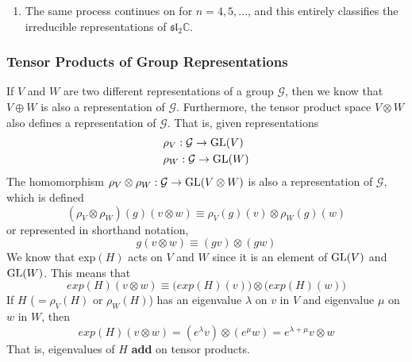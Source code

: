 \begin{enumerate}
    \item The same process continues on for $n=4, 5, ...$, and this entirely classifies the irreducible representations of $\mathfrak{sl}_2 \mathbb{C}$. 
  \end{enumerate} 

  \pagebreak

  \subsubsection{Tensor Products of Group Representations}

    \begin{definition}
      If $V$ and $W$ are two different representations of a group $\mathcal{G}$, then we know that $V \oplus W$ is also a representation of $\mathcal{G}$. Furthermore, the tensor product space $V \otimes W$ also defines a representation of $\mathcal{G}$. That is, given representations
      \begin{align*}
        & \rho_V: \mathcal{G} \rightarrow \operatorname{GL}(V) \\
        & \rho_W: \mathcal{G} \rightarrow \operatorname{GL}(W)
      \end{align*}
      The homomorphism $\rho_V \otimes \rho_W: \mathcal{G} \rightarrow \operatorname{GL}(V \otimes W)$ is also a representation of $\mathcal{G}$, which is defined
      \begin{equation}
        (\rho_V \otimes \rho_W)(g) (v \otimes w) \equiv \rho_V (g) (v) \otimes \rho_W (g) (w)
      \end{equation}
      or represented in shorthand notation, 
      \begin{equation}
        g(v \otimes w) \equiv (g v) \otimes (g w)
      \end{equation}
      We know that exp$(H)$ acts on $V$ and $W$ since it is an element of $\operatorname{GL}(V)$ and $\operatorname{GL}(W)$. This means that
      \begin{equation}
        exp(H)(v \otimes w) \equiv \big( exp(H)(v)\big) \otimes \big( exp(H)(w)\big)
      \end{equation}
      If $H$ ($= \rho_V (H)$ or $\rho_W(H)$) has an eigenvalue $\lambda$ on $v$ in $V$ and eigenvalue $\mu$ on $w$ in $W$, then 
      \begin{equation}
        exp(H) (v \otimes w) = (e^\lambda v) \otimes (e^\mu w) = e^{\lambda + \mu} v \otimes w
      \end{equation}
      That is, eigenvalues of $H$ \textbf{add} on tensor products. 
    \end{definition}

